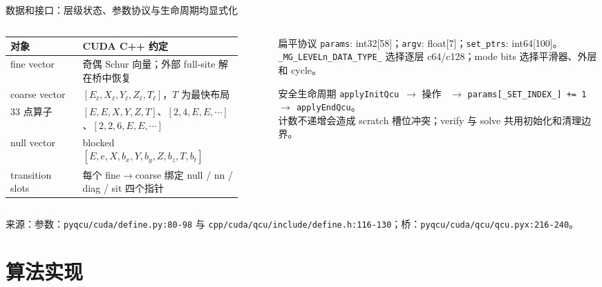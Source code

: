 \documentclass[UTF8,aspectratio=169,11pt]{ctexbeamer}
\newcommand{\source}[1]{%
  \vspace{0.06em}\par{\raggedright\scriptsize\color{muted}来源：#1\par}}
\newcommand{\code}[1]{\nolinkurl{#1}}
\begin{document}
\begin{frame}[t]{数据和接口：层级状态、参数协议与生命周期均显式化}
  \begin{columns}[T,totalwidth=\textwidth]
    \begin{column}{0.54\textwidth}
      \small
      \begin{tabular}{@{}P{0.28\linewidth}P{0.62\linewidth}@{}}
        \toprule
        对象 & CUDA C++ 约定 \\
        \midrule
        fine vector & 奇偶 Schur 向量；外部 full-site 解在桥中恢复 \\
        coarse vector & $[E_\ell,X_\ell,Y_\ell,Z_\ell,T_\ell]$，$T$ 为最快布局 \\
        33 点算子 & $[E,E,X,Y,Z,T]$、$[2,4,E,E,\cdots]$、$[2,2,6,E,E,\cdots]$ \\
        null vector & blocked $[E,e,X,b_x,Y,b_y,Z,b_z,T,b_t]$ \\
        transition slots & 每个 fine$\to$coarse 绑定 null / nn / diag / sit 四个指针 \\
        \bottomrule
      \end{tabular}
    \end{column}
    \begin{column}{0.42\textwidth}
      \begin{block}{扁平协议}
        \small
        \code{params}: int32[58]；\code{argv}: float[7]；\code{set_ptrs}: int64[100]。\\
        \code{_MG_LEVELn_DATA_TYPE_} 选择逐层 c64/c128；mode bits 选择平滑器、外层和 cycle。
      \end{block}
      \begin{block}{安全生命周期}
        \small
        \code{applyInitQcu}\ $\to$ 操作 \ $\to$ \code{params[_SET_INDEX_] += 1}\ $\to$ \code{applyEndQcu}。\\
        计数不递增会造成 scratch 槽位冲突；verify 与 solve 共用初始化和清理边界。
      \end{block}
    \end{column}
  \end{columns}
  \source{参数：\code{pyqcu/cuda/define.py:80-98} 与 \code{cpp/cuda/qcu/include/define.h:116-130}；桥：\code{pyqcu/cuda/qcu/qcu.pyx:216-240}。}
\end{frame}

\section{算法实现}
\end{document}
